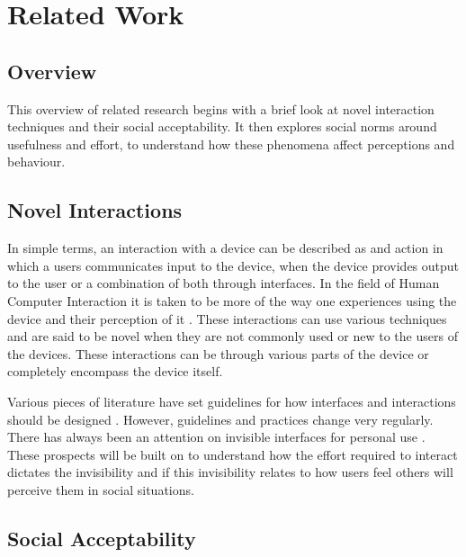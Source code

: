 \documentclass{l4proj}
\begin{document}
\chapter{Related Work}
\section{Overview}

This overview of related research begins with a brief look at novel interaction techniques and their social acceptability. It then explores social norms around usefulness and effort, to understand how these phenomena affect perceptions and behaviour.

\section{Novel Interactions}

In simple terms, an interaction with a device can be described as and action in which a users communicates input to the device, when the device provides output to the user or a combination of both through interfaces. In the field of Human Computer Interaction it is taken to be more of the way one experiences using the device and their perception of it \citep{beaudouin-lafon_designing_2004}. These interactions can use various techniques and are said to be novel when they are not commonly used or new to the users of the devices. These interactions can be through various parts of the device or completely encompass the device itself. 

Various pieces of literature have set guidelines for how interfaces and interactions should be designed \citep{beaudouin-lafon_designing_2004, gong_guidelines_nodate}. However, guidelines and practices change very regularly. There has always been an attention on invisible interfaces for personal use \citep{schiphorst_really_2007}. These prospects will be built on to understand how the effort required to interact dictates the invisibility and if this invisibility relates to how users feel others will perceive them in social situations.

\section{Social Acceptability}
\end{document}
